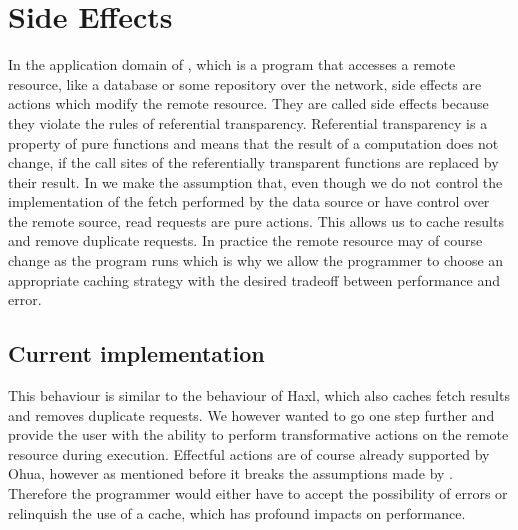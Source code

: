 \chapter{Side Effects}
\label{ch:side-effects}


In the application domain of \yauhau{}, which is a program that accesses a remote resource, like a database or some repository over the network, side effects are actions which modify the remote resource.
They are called side effects because they violate the rules of referential transparency.
Referential transparency is a property of pure functions and means that the result of a computation does not change, if the call sites of the referentially transparent functions are replaced by their result.
In \yauhau{} we make the assumption that, even though we do not control the implementation of the fetch performed by the data source or have control over the remote source, read requests are pure actions.
This allows us to cache results and remove duplicate requests.
In practice the remote resource may of course change as the program runs which is why we allow the programmer to choose an appropriate caching strategy with the desired tradeoff between performance and error.

\section{Current implementation}

This behaviour is similar to the behaviour of Haxl, which also caches fetch results and removes duplicate requests.
We however wanted to go one step further and provide the user with the ability to perform transformative actions on the remote resource during execution.
Effectful actions are of course already supported by Ohua, however as mentioned before it breaks the assumptions made by \yauhau{}.
Therefore the programmer would either have to accept the possibility of errors or relinquish the use of a cache, which has profound impacts on performance.

